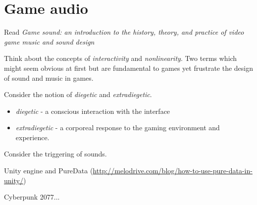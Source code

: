 
\chapter{Game audio}
\label{games}


Read \textit{Game sound: an introduction to the history, theory, and practice of video game music and sound design} \citep{collins2008game}

Think about the concepts of \textit{interactivity} and \textit{nonlinearity}. Two terms which might seem obvious at first but are fundamental to games yet frustrate the design of sound and music in games. 

Consider the notion of \textit{diegetic} and \textit{extradiegetic}. 
\begin{itemize}
\item \textit{diegetic} - a conscious interaction with the interface
\item \textit{extradiegetic} - a corporeal response to the gaming environment and experience. 
\end{itemize}

Consider the triggering of sounds. 

Unity engine and PureData (\url{http://melodrive.com/blog/how-to-use-pure-data-in-unity/})

Cyberpunk 2077...

